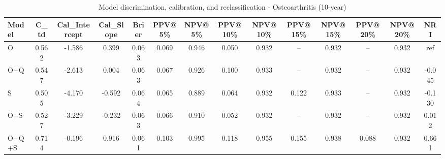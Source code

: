 \begin{table}[htbp]
\centering
\small
\caption{Model discrimination, calibration, and reclassification - Osteoarthritis (10-year)}
\label{tab:perf_osteoarthritis_10y}
\begin{tabular}{lccccccccccccc}
\toprule
Model & C\_td & Cal\_Intercept & Cal\_Slope & Brier & PPV@5\% & NPV@5\% & PPV@10\% & NPV@10\% & PPV@15\% & NPV@15\% & PPV@20\% & NPV@20\% & NRI \\
\midrule
O & 0.562 & -1.586 & 0.399 & 0.063 & 0.069 & 0.946 & 0.050 & 0.932 & -- & 0.932 & -- & 0.932 & ref \\
O+Q & 0.547 & -2.613 & 0.004 & 0.063 & 0.067 & 0.926 & 0.100 & 0.933 & -- & 0.932 & -- & 0.932 & -0.045 \\
S & 0.505 & -4.170 & -0.592 & 0.064 & 0.065 & 0.889 & 0.064 & 0.932 & 0.122 & 0.933 & -- & 0.932 & -0.130 \\
O+S & 0.527 & -3.229 & -0.232 & 0.063 & 0.066 & 0.910 & 0.052 & 0.932 & -- & 0.932 & -- & 0.932 & 0.012 \\
O+Q+S & 0.714 & -0.196 & 0.916 & 0.061 & 0.103 & 0.995 & 0.118 & 0.955 & 0.155 & 0.938 & 0.088 & 0.932 & 0.661 \\
\bottomrule
\end{tabular}
\end{table}